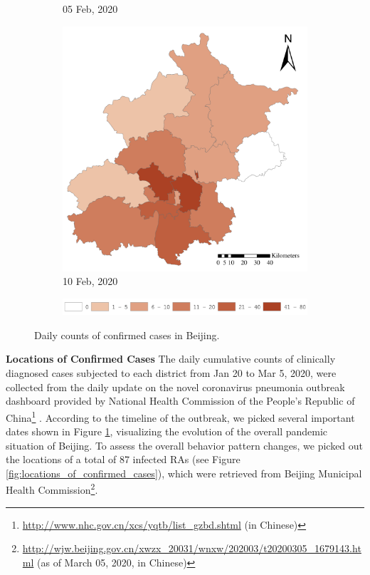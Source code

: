 \documentclass[ijgi,submit,moreauthors,pdftex]{Definitions/mdpi}
\begin{document}
\begin{figure}[ht]
\begin{subfigure}{.23\textwidth}
        \caption{05 Feb, 2020}
    \end{subfigure}
    \begin{subfigure}{.23\textwidth}
        \includegraphics[width=\textwidth]{Figures/ConfirmedDistrictD2020_02_10-eps-converted-to.pdf}
        \caption{10 Feb, 2020}
    \end{subfigure}

    \vspace{6pt}
    \begin{subfigure}{0.7\textwidth}
        \includegraphics[width=\textwidth]{Figures/Fig2legend-eps-converted-to.pdf}
    \end{subfigure}
    \caption{Daily counts of confirmed cases in Beijing.}
    \label{fig:number_of_confirmed_cases}
\end{figure}

\textbf{Locations of Confirmed Cases}
The daily cumulative counts of clinically diagnosed cases subjected to each district from Jan 20 to Mar 5, 2020, were collected from the daily update on the novel coronavirus pneumonia outbreak dashboard provided by National Health Commission of the People's Republic of China\footnote{\url{http://www.nhc.gov.cn/xcs/yqtb/list_gzbd.shtml} (in Chinese)} .
According to the timeline \cite{li2020early} of the outbreak, we picked several important dates shown in Figure \ref{fig:number_of_confirmed_cases}, visualizing the evolution of the overall pandemic situation of Beijing.
To assess the overall behavior pattern changes, we picked out the locations of a total of 87 infected RAs (see Figure \ref{fig:locations_of_confirmed_cases}), which were retrieved from Beijing Municipal Health Commission\footnote{\url{http://wjw.beijing.gov.cn/xwzx_20031/wnxw/202003/t20200305_1679143.html} (as of March 05, 2020, in Chinese)}.
\end{document}
